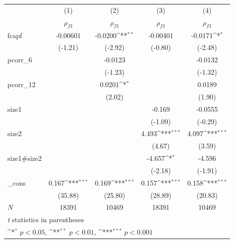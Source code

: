 \documentclass[12pt]{article}
\begin{document}
\begin{table}
\centering
{
\def\sym#1{\ifmmode^{#1}\else\(^{#1}\)\fi}
\begin{tabular}{l*{4}{c}}
\hline\hline
            &\multicolumn{1}{c}{(1)}&\multicolumn{1}{c}{(2)}&\multicolumn{1}{c}{(3)}&\multicolumn{1}{c}{(4)}\\
            &\multicolumn{1}{c}{$ \rho_{f3} $}&\multicolumn{1}{c}{$ \rho_{f3} $}&\multicolumn{1}{c}{$ \rho_{f3} $}&\multicolumn{1}{c}{$ \rho_{f3} $}\\
\hline
fcapf       &    -0.00601         &     -0.0200\sym{**} &    -0.00401         &     -0.0171\sym{*}  \\
            &     (-1.21)         &     (-2.92)         &     (-0.80)         &     (-2.48)         \\
[1em]
pcorr\_6     &                     &     -0.0123         &                     &     -0.0132         \\
            &                     &     (-1.23)         &                     &     (-1.32)         \\
[1em]
pcorr\_12    &                     &      0.0201\sym{*}  &                     &      0.0189         \\
            &                     &      (2.02)         &                     &      (1.90)         \\
[1em]
size1       &                     &                     &      -0.169         &     -0.0555         \\
            &                     &                     &     (-1.09)         &     (-0.29)         \\
[1em]
size2       &                     &                     &       4.493\sym{***}&       4.097\sym{***}\\
            &                     &                     &      (4.67)         &      (3.59)         \\
[1em]
size1\#size2&                     &                     &      -4.657\sym{*}  &      -4.596         \\
            &                     &                     &     (-2.18)         &     (-1.91)         \\
[1em]
\_cons      &       0.167\sym{***}&       0.169\sym{***}&       0.157\sym{***}&       0.158\sym{***}\\
            &     (35.88)         &     (25.80)         &     (28.89)         &     (20.83)         \\
\hline
\(N\)       &       18391         &       10469         &       18391         &       10469         \\
\hline\hline
\multicolumn{5}{l}{\footnotesize \textit{t} statistics in parentheses}\\
\multicolumn{5}{l}{\footnotesize \sym{*} \(p<0.05\), \sym{**} \(p<0.01\), \sym{***} \(p<0.001\)}\\
\end{tabular}
}

\end{table}
\end{document}
